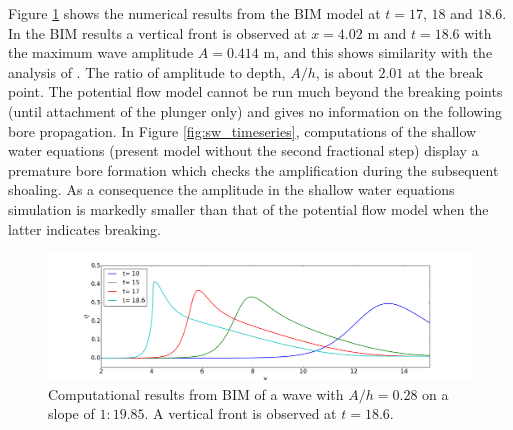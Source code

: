 \documentclass[review]{elsarticle}
\begin{document}
Figure \ref{fig:bim_breaking} shows
the numerical results from the BIM model at $t=17$, $18$ and  $18.6$.
In the BIM results a vertical front is observed at $x=4.02$ m and $t=18.6$
with the maximum wave amplitude $A=0.414$ m, and this shows similarity with 
the analysis of \citet{titov1995modeling}.
The ratio of amplitude to depth, $A/h$, 
is about $2.01$ at the break point.
The potential flow model cannot be run much beyond the
breaking points (until attachment of the plunger only) and 
gives no information on the following  bore propagation.
In Figure \ref{fig:sw_timeseries}, 
computations of the shallow water equations
(present model without the second fractional step) 
display a premature bore formation which checks the
amplification during the subsequent shoaling. 
As a consequence the amplitude 
in the shallow water equations simulation 
is markedly smaller than that of the 
potential flow model when the latter indicates breaking.

\begin{figure}[!htb]
\centering
\includegraphics[width=\textwidth]{_fig/bim_n7_time_series.png}
\caption{Computational results from BIM of a wave with $A/h=0.28$ 
on a slope of $1:19.85$.
A vertical front is observed at $t=18.6$. }
\label{fig:bim_breaking}
\end{figure}



\end{document}
